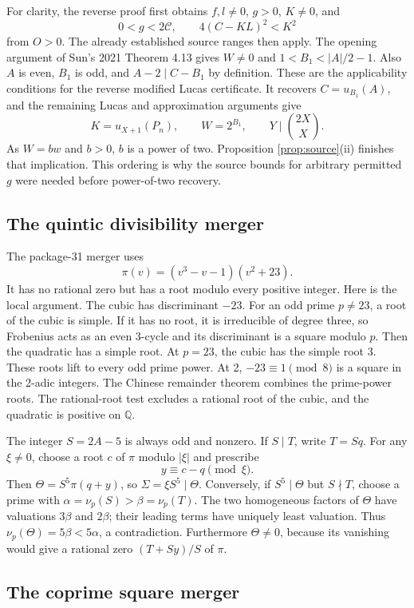 \documentclass[11pt]{article}
\newcommand{\capC}{\mathscr C}
\theoremstyle{definition}
\theoremstyle{remark}
\numberwithin{equation}{section}
\begin{document}
For clarity, the reverse proof first obtains \(f,l\ne0\),
\(g>0\), \(K\ne0\), and
\[
 0<g<2\capC,\qquad 4(C-KL)^2<K^2
\]
from \(O>0\). The already established source ranges then apply.
The opening argument of Sun's 2021 Theorem 4.13 gives
\(W\ne0\) and \(1<B_1<|A|/2-1\). Also \(A\) is even, \(B_1\) is odd, and
\(A-2\mid C-B_1\) by definition. These are the applicability conditions
for the reverse modified Lucas certificate. It recovers
\(C=u_{B_1}(A)\), and the remaining
Lucas and approximation arguments give
\[
 K=u_{X+1}(P_n),\qquad W=2^{B_1},\qquad
 Y\mid\binom{2X}{X}.
\]
As \(W=bw\) and \(b>0\), \(b\) is a power of two.
Proposition \ref{prop:source}(ii) finishes that implication.
This ordering is why the source bounds for arbitrary permitted \(g\)
were needed before power-of-two recovery.

\subsection{The quintic divisibility merger}

The package-31 merger uses
\[
 \pi(v)=(v^3-v-1)(v^2+23).
\]
It has no rational zero but has a root modulo every positive integer.
Here is the local argument. The cubic has discriminant \(-23\).
For an odd prime \(p\ne23\), a root of the cubic is simple. If it has
no root, it is irreducible of degree three, so Frobenius acts as an even
3-cycle and its discriminant is a square modulo \(p\). Then the
quadratic has a simple root. At \(p=23\), the cubic has the simple root
3. These roots lift to every odd prime power. At 2, \(-23\equiv1\pmod8\)
is a square in the 2-adic integers. The Chinese remainder theorem
combines the prime-power roots. The rational-root test excludes a
rational root of the cubic, and the quadratic is positive on \(\mathbb Q\).

The integer \(S=2A-5\) is always odd and nonzero.
If \(S\mid T\), write \(T=Sq\). For any \(\xi\ne0\), choose a root
\(c\) of \(\pi\) modulo \(|\xi|\) and prescribe
\[
 y\equiv c-q\pmod{\xi}.
\]
Then \(\Theta=S^5\pi(q+y)\), so \(\Sigma=\xi S^5\mid\Theta\).
Conversely, if \(S^5\mid\Theta\) but \(S\nmid T\), choose a prime
with \(\alpha=\nu_p(S)>\beta=\nu_p(T)\).
The two homogeneous factors of \(\Theta\) have valuations \(3\beta\)
and \(2\beta\); their leading terms have uniquely least valuation.
Thus \(\nu_p(\Theta)=5\beta<5\alpha\), a contradiction.
Furthermore \(\Theta\ne0\), because its vanishing would give a rational
zero \((T+Sy)/S\) of \(\pi\).

\subsection{The coprime square merger}
\end{document}
